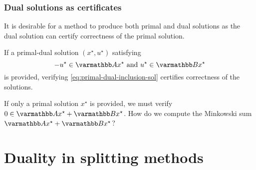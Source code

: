 \documentclass[10pt,mathserif]{beamer}
\begin{document}
\begin{frame}
\frametitle{Dual solutions as certificates}
It is desirable for a method to produce both primal and dual solutions as the dual solution can certify correctness of the primal solution.

\vspace{0.2in}

If a primal-dual solution $(x^\star,u ^\star)$ satisfying 
\begin{equation}
-u ^\star\in \opA x^\star\text{ and }u ^\star\in \opB x^\star
\label{eq:primal-dual-inclusion-sol}
\end{equation}
 is provided, verifying \eqref{eq:primal-dual-inclusion-sol} certifies correctness of the solutions.



\vspace{0.2in}


If only a primal solution $x^\star$ is provided, we must verify $0\in \opA x^\star+\opB x^\star$. How do we compute the 
Minkowski sum $\opA x^\star+\opB x^\star$?



\end{frame}



\section{Duality in splitting methods}
\end{document}
